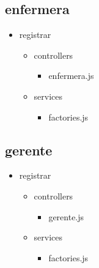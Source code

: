 	
	\subsection{enfermera}
		\begin{itemize}
		\item registrar
		\begin{itemize}
			\item controllers
			\begin{itemize}
				\item enfermera.js
			\end{itemize}
			\item services
			\begin{itemize}
				\item factories.js
			\end{itemize}
		\end{itemize}
	\end{itemize}
	
	
	\subsection{gerente}
		\begin{itemize}
		\item registrar
		\begin{itemize}
			\item controllers
			\begin{itemize}
				\item gerente.js
			\end{itemize}
			\item services
			\begin{itemize}
				\item factories.js
			\end{itemize}
		\end{itemize}
	\end{itemize}
	
	
